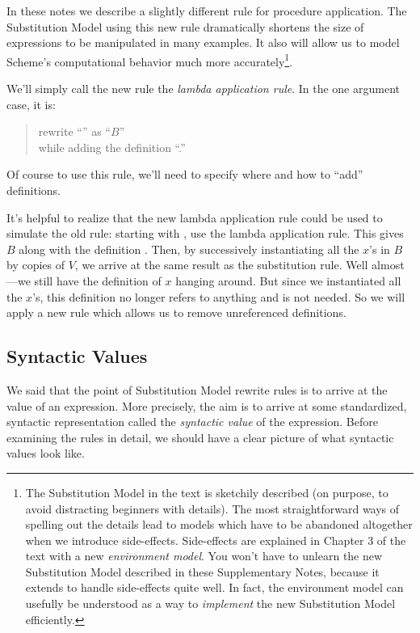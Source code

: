 \documentclass[11pt]{article}
\begin{document}
In these notes we describe a slightly different rule for procedure
application.  The Substitution Model using this new rule dramatically
shortens the size of expressions to be manipulated in many examples.
It also will allow us to model Scheme's computational behavior much
more accurately\footnote{The Substitution Model in the text is
  sketchily described (on purpose, to avoid distracting beginners with
  details).  The most straightforward ways of spelling out the details
  lead to models which have to be abandoned altogether when we
  introduce side-effects.  Side-effects are explained in Chapter 3 of
  the text with a new {\em environment model}.  You won't have to
  unlearn the new Substitution Model described in these Supplementary
  Notes, because it extends to handle side-effects quite well.  In
  fact, the environment model can usefully be understood as a way to
  {\em implement} the new Substitution Model efficiently.}.

We'll simply call the new rule the {\em lambda application rule}.  In the
one argument case, it is:
\begin{quote}
rewrite ``'' as ``$B$''\\
while adding the definition ``.''
\end{quote}
Of course to use this rule, we'll need to specify where and how to ``add''
definitions.

It's helpful to realize that the new lambda application rule could be used
to simulate the old rule: starting with ,
use the lambda application rule.  This gives $B$ along with the definition
.  Then, by successively instantiating all the
$x$'s in $B$ by copies of $V$, we arrive at the same result as the
substitution rule.  Well almost---we still have the definition of $x$
hanging around.  But since we instantiated all the $x$'s, this definition
no longer refers to anything and is not needed.  So we will apply a new
rule which allows us to remove unreferenced definitions.

\subsection{Syntactic Values}

We said that the point of Substitution Model rewrite rules is to arrive at
the value of an expression.  More precisely, the aim is to arrive at some
standardized, syntactic representation called the {\em syntactic value} of
the expression.  Before examining the rules in detail, we should have a
clear picture of what syntactic values look like.
\end{document}
